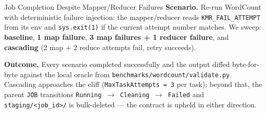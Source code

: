 \documentclass[11pt]{beamer}
\begin{document}
\begin{frame}{Job Completion Despite Mapper/Reducer Failures}
\textbf{Scenario.} Re-run WordCount with deterministic failure injection:
the mapper/reducer reads \texttt{KMR\_FAIL\_ATTEMPT} from its env and
\texttt{sys.exit(1)} if the current attempt number matches. We sweep:
\textbf{baseline}, \textbf{1 map failure}, \textbf{3 map failures + 1 reducer failure},
and \textbf{cascading} (2 map + 2 reduce attempts fail, retry succeeds).

\vspace{0.2em}
\centering
{}

\scriptsize
\textbf{Outcome.} Every scenario \alert{completed successfully} and the output diffed
byte-for-byte against the local oracle from \texttt{benchmarks/wordcount/validate.py}.
\alert{Cascading} approaches the cliff (\texttt{MaxTaskAttempts = 3} per task);
beyond that, the parent \texttt{JOB} transitions \texttt{Running $\to$ Cleaning $\to$ Failed}
and \texttt{staging/<job\_id>/} is bulk-deleted --- the contract is upheld in either direction.
\end{frame}
\end{document}
